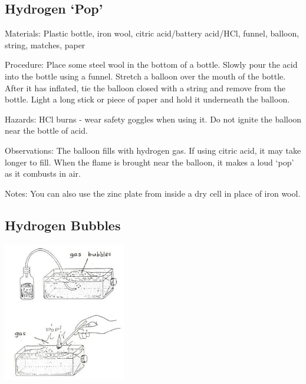 \begin{multicols}{2}
\subsection{Hydrogen `Pop'}


\begin{description*}
\item[Materials:]{Plastic bottle, iron wool, citric acid/battery acid/HCl, funnel, balloon, string, matches, paper}
\item[Procedure:]{Place some steel wool in the bottom of a bottle. Slowly pour the acid into the bottle using a funnel. Stretch a balloon over the mouth of the bottle. After it has inflated, tie the balloon closed with a string and remove from the bottle. Light a long stick or piece of paper and hold it underneath the balloon.}
\item[Hazards:]{HCl burns - wear safety goggles when using it. Do not ignite the balloon near the bottle of acid.}
\item[Observations:]{The balloon fills with hydrogen gas. If using citric acid, it may take longer to fill. When the flame is brought near the balloon, it makes a loud `pop' as it combusts in air.}
\item[Notes:]{You can also use the zinc plate from inside a dry cell in place of iron wool.}
\end{description*}

\columnbreak

\subsection{Hydrogen Bubbles}

\begin{center}
\includegraphics[width=0.4\textwidth]{./img/source/hydrogen-bubbles.jpg}
\end{center}


\end{multicols}
